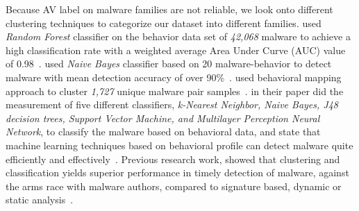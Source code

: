 Because AV label on malware families are not reliable, we look onto different clustering techniques to categorize our dataset into different families.
\textbf{\citeauthor{pirscoveanu}} used \emph{Random Forest} classifier on the behavior data set of \emph{42,068} malware to achieve a high classification rate with a weighted average Area Under Curve (AUC) value of 0.98~\cite[]{pirscoveanu}.
\textbf{\citeauthor{mosko}} used \emph{Naive Bayes} classifier based on 20 malware-behavior to detect malware with mean detection accuracy of over 90\%~\cite[]{mosko}.
\textbf{\citeauthor{yavvari}} used behavioral mapping approach to cluster \emph{1,727} unique malware pair samples~\cite[]{yavvari}.
\textbf{\citeauthor{firdausi}} in their paper did the measurement of five different classifiers, \emph{k-Nearest Neighbor, Naive Bayes, J48 decision trees, Support Vector Machine, and Multilayer Perception Neural Network}, to classify the malware based on behavioral data, and state that machine learning techniques based on behavioral profile can detect malware quite efficiently and effectively~\cite[]{firdausi}.
Previous research work, showed that clustering and classification yields superior performance in timely detection of malware, against the arms race with malware authors, compared to signature based, dynamic or static analysis~\cite[]{bailey,bayer,rieck2009automatic}.
\\

